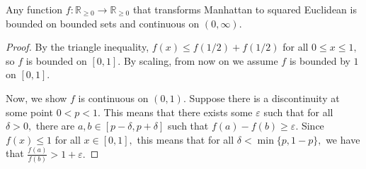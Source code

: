   \begin{lemma} \label{lem:bound-cont} Any function $f:\mathbb R_{\geq 0}\to\mathbb R_{\geq 0}$ that transforms
  Manhattan to squared Euclidean is bounded on bounded sets and
  continuous on $(0, \infty)$.
  \end{lemma} 
  \begin{proof} 
  By the triangle inequality, $f(x) \le f(1/2)+f(1/2)$ for all $0 \le x \le 1,$ so $f$ is bounded on $[0,1]$.
  By scaling, from now on we assume $f$ is bounded by $1$ on $[0, 1]$.

\iffalse
  Next, we show that $f$ must be
  nondecreasing on the range $[0, 1]$.


  Assume otherwise. Suppose $a < b$ but $f(a) > f(b)$. Now, we choose
  $n=2k$ and points $x_1, \ldots x_n$ partitioned into sets $A = x_1,
  \ldots, x_k$ and $B= x_{k+1}, \ldots, x_n$. Define the metric 
  \[d(x_i, x_j) :=
    \begin{cases}
    0 & i = j \\
    a & i,j\in A\text{ or }i, j \in B\\
    b & i \in A\text{ and }j \in B\text{, or vice versa}\\
    \end{cases}
  \]
  Note that this is embeddable into $\ell_1$: start by picking uniform
  distance metric on $\ell_1$, and then add an extra dimension
  separating points in $A$ and $B$ by $b-a$.

  Now apply $f$: we want some metric $d'(x_i, x_j)$ such that
  \[d'(x_i, x_j) :=
    \begin{cases}
    0 & i = j \\
    f(a) & i,j\in A\text{ or }i, j \in B\\
    f(b) & i \in A\text{ and }j \in B\text{, or vice versa}\\
    \end{cases}
  \]
  We will now show that matrix $D'_{i, j}$ is not negative type.
  Consider the vector 
  \[ v = (1, 1, \ldots 1, -1, -1, \ldots -1) \]
  with $k$ $1's$ and $k$ $-1's$. This is orthogonal to the all ones
  vector, but $v^T D' v = 2k(k-1)f(a) - 2k^2f(b)$. Since $f(a) > f(b)$
  by assumption, this is $>0$ for large $k$. This is a contradiction, so
  $f$ must be nondecreasing on [0, 1].
\fi

  Now, we show $f$ is continuous on $(0, 1)$. Suppose there is a discontinuity at some point $0 < p < 1$. This means that there exists some $\varepsilon$ such that for all $\delta > 0,$ there are $a, b \in [p-\delta, p+\delta]$ such that $f(a)-f(b) \ge \varepsilon.$ Since $f(x) \le 1$ for all $x \in [0, 1],$ this means that for all $\delta < \min \{ p, 1-p\},$ we have that $\frac{f(a)}{f(b)} > 1+\varepsilon.$
  

\end{proof}
